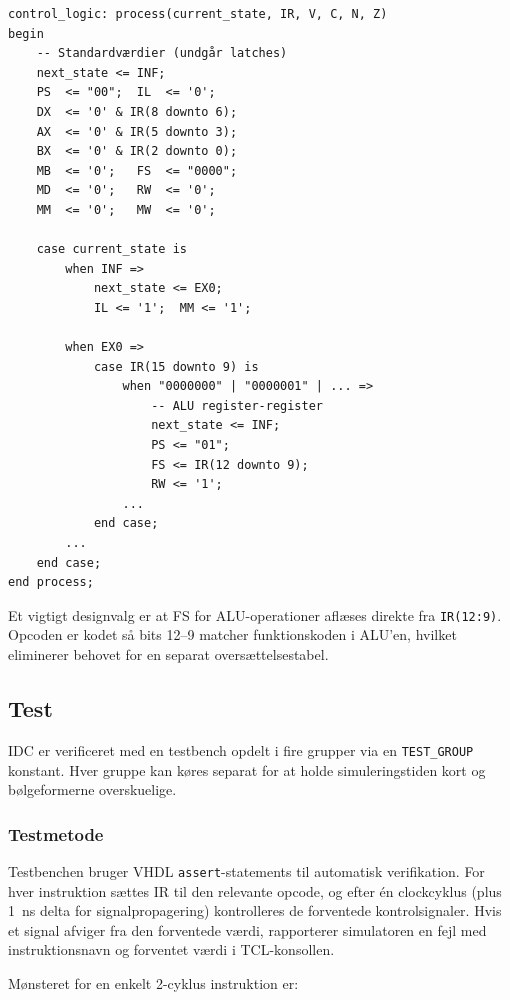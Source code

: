 \documentclass{article}
\begin{document}
\begin{lstlisting}[style=vhdl, caption={IDC kombinatorisk process (uddrag)}, label={lst:idc-comb}]
control_logic: process(current_state, IR, V, C, N, Z)
begin
    -- Standardværdier (undgår latches)
    next_state <= INF;
    PS  <= "00";  IL  <= '0';
    DX  <= '0' & IR(8 downto 6);
    AX  <= '0' & IR(5 downto 3);
    BX  <= '0' & IR(2 downto 0);
    MB  <= '0';   FS  <= "0000";
    MD  <= '0';   RW  <= '0';
    MM  <= '0';   MW  <= '0';

    case current_state is
        when INF =>
            next_state <= EX0;
            IL <= '1';  MM <= '1';

        when EX0 =>
            case IR(15 downto 9) is
                when "0000000" | "0000001" | ... =>
                    -- ALU register-register
                    next_state <= INF;
                    PS <= "01";
                    FS <= IR(12 downto 9);
                    RW <= '1';
                ...
            end case;
        ...
    end case;
end process;
\end{lstlisting}

\noindent Et vigtigt designvalg er at FS for ALU-operationer aflæses direkte fra \texttt{IR(12:9)}.
Opcoden er kodet så bits 12--9 matcher funktionskoden i ALU'en, hvilket eliminerer behovet
for en separat oversættelsestabel.

\subsection{Test}
\label{sec:idc-test}

IDC er verificeret med en testbench opdelt i fire grupper via en \texttt{TEST\_GROUP} konstant.
Hver gruppe kan køres separat for at holde simuleringstiden kort og
bølgeformerne overskuelige.

\subsubsection{Testmetode}

Testbenchen bruger VHDL \texttt{assert}-statements til automatisk verifikation.
For hver instruktion sættes IR til den relevante opcode, og efter én clockcyklus
(plus 1~ns delta for signalpropagering) kontrolleres de forventede kontrolsignaler.
Hvis et signal afviger fra den forventede værdi, rapporterer simulatoren en fejl
med instruktionsnavn og forventet værdi i TCL-konsollen.

\noindent Mønsteret for en enkelt 2-cyklus instruktion er:
\end{document}
